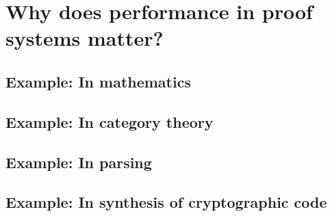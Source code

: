 \chapter{Why does performance in proof systems matter?} \label{ch:motivation} \label{ch:why-perf-matters}


\section{Example: In mathematics}

\section{Example: In category theory}


\section{Example: In parsing}

\section{Example: In synthesis of cryptographic code}
